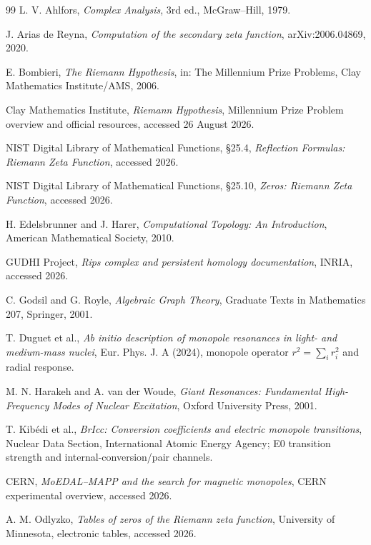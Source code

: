 \documentclass[11pt]{amsart}
\theoremstyle{definition}
\theoremstyle{remark}
\begin{document}
\begin{thebibliography}{99}
L. V. Ahlfors, \emph{Complex Analysis}, 3rd ed., McGraw--Hill, 1979.

J. Arias de Reyna, \emph{Computation of the secondary zeta function}, arXiv:2006.04869, 2020.

E. Bombieri, \emph{The Riemann Hypothesis}, in: The Millennium Prize Problems, Clay Mathematics Institute/AMS, 2006.

Clay Mathematics Institute, \emph{Riemann Hypothesis}, Millennium Prize Problem overview and official resources, accessed 26 August 2026.

NIST Digital Library of Mathematical Functions, \S25.4, \emph{Reflection Formulas: Riemann Zeta Function}, accessed 2026.

NIST Digital Library of Mathematical Functions, \S25.10, \emph{Zeros: Riemann Zeta Function}, accessed 2026.

H. Edelsbrunner and J. Harer, \emph{Computational Topology: An Introduction}, American Mathematical Society, 2010.

GUDHI Project, \emph{Rips complex and persistent homology documentation}, INRIA, accessed 2026.

C. Godsil and G. Royle, \emph{Algebraic Graph Theory}, Graduate Texts in Mathematics 207, Springer, 2001.

T. Duguet et al., \emph{Ab initio description of monopole resonances in light- and medium-mass nuclei}, Eur. Phys. J. A (2024), monopole operator $r^2=\sum_i r_i^2$ and radial response.

M. N. Harakeh and A. van der Woude, \emph{Giant Resonances: Fundamental High-Frequency Modes of Nuclear Excitation}, Oxford University Press, 2001.

T. Kib\'edi et al., \emph{BrIcc: Conversion coefficients and electric monopole transitions}, Nuclear Data Section, International Atomic Energy Agency; E0 transition strength and internal-conversion/pair channels.

CERN, \emph{MoEDAL--MAPP and the search for magnetic monopoles}, CERN experimental overview, accessed 2026.

A. M. Odlyzko, \emph{Tables of zeros of the Riemann zeta function}, University of Minnesota, electronic tables, accessed 2026.


\end{thebibliography}
\end{document}
